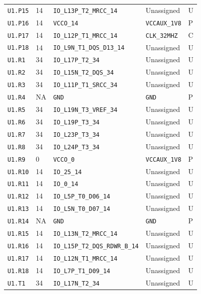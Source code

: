 \documentclass[11pt,a4paper]{article}
\begin{document}
\begin{longtable}{@{}P{20mm}P{10mm}P{75mm}P{49mm}P{7mm}@{}}
\nolinkurl{U1.P15} & 14 & \nolinkurl{IO_L13P_T2_MRCC_14} & Unassigned & U \\
\nolinkurl{U1.P16} & 14 & \nolinkurl{VCCO_14} & \nolinkurl{VCCAUX_1V8} & P \\
\nolinkurl{U1.P17} & 14 & \nolinkurl{IO_L12P_T1_MRCC_14} & \nolinkurl{CLK_32MHZ} & C \\
\nolinkurl{U1.P18} & 14 & \nolinkurl{IO_L9N_T1_DQS_D13_14} & Unassigned & U \\
\nolinkurl{U1.R1} & 34 & \nolinkurl{IO_L17P_T2_34} & Unassigned & U \\
\nolinkurl{U1.R2} & 34 & \nolinkurl{IO_L15N_T2_DQS_34} & Unassigned & U \\
\nolinkurl{U1.R3} & 34 & \nolinkurl{IO_L11P_T1_SRCC_34} & Unassigned & U \\
\nolinkurl{U1.R4} & NA & \nolinkurl{GND} & \nolinkurl{GND} & P \\
\nolinkurl{U1.R5} & 34 & \nolinkurl{IO_L19N_T3_VREF_34} & Unassigned & U \\
\nolinkurl{U1.R6} & 34 & \nolinkurl{IO_L19P_T3_34} & Unassigned & U \\
\nolinkurl{U1.R7} & 34 & \nolinkurl{IO_L23P_T3_34} & Unassigned & U \\
\nolinkurl{U1.R8} & 34 & \nolinkurl{IO_L24P_T3_34} & Unassigned & U \\
\nolinkurl{U1.R9} & 0 & \nolinkurl{VCCO_0} & \nolinkurl{VCCAUX_1V8} & P \\
\nolinkurl{U1.R10} & 14 & \nolinkurl{IO_25_14} & Unassigned & U \\
\nolinkurl{U1.R11} & 14 & \nolinkurl{IO_0_14} & Unassigned & U \\
\nolinkurl{U1.R12} & 14 & \nolinkurl{IO_L5P_T0_D06_14} & Unassigned & U \\
\nolinkurl{U1.R13} & 14 & \nolinkurl{IO_L5N_T0_D07_14} & Unassigned & U \\
\nolinkurl{U1.R14} & NA & \nolinkurl{GND} & \nolinkurl{GND} & P \\
\nolinkurl{U1.R15} & 14 & \nolinkurl{IO_L13N_T2_MRCC_14} & Unassigned & U \\
\nolinkurl{U1.R16} & 14 & \nolinkurl{IO_L15P_T2_DQS_RDWR_B_14} & Unassigned & U \\
\nolinkurl{U1.R17} & 14 & \nolinkurl{IO_L12N_T1_MRCC_14} & Unassigned & U \\
\nolinkurl{U1.R18} & 14 & \nolinkurl{IO_L7P_T1_D09_14} & Unassigned & U \\
\nolinkurl{U1.T1} & 34 & \nolinkurl{IO_L17N_T2_34} & Unassigned & U \\

\end{longtable}
\end{document}
